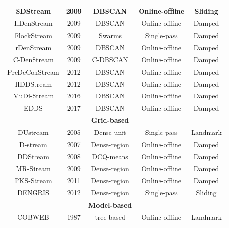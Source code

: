 \begin{table}[h]
\begin{tabular}{c c c c c}
     \hline
     SDStream            &    2009     &    DBSCAN       & Online-offline  &   Sliding \\
      \hline
      HDenStream         &     2009    &    DBSCAN       &  Online-offline &   Damped  \\
        \hline
      FlockStream        &     2009    &    Swarms       &  Single-pass    &   Damped  \\
        \hline 
      rDenStream         &    2009     &     DBSCAN      & Online-offline  &   Damped  \\
        \hline 
      C-DenStream        &    2009     &     C-DBSCAN    &Online-offline   &   Damped \\
          \hline 
      PreDeConStream     &    2012     &     DBSCAN      & Online-offline  &   Damped \\
          \hline 
      HDDStream          &    2012     &     DBSCAN      & Online-offline  &   Damped   \\
          \hline 
      MuDi-Stream        &    2016     &       DBSCAN    & Online-offline  &   Damped\\
      \hline          
      EDDS               &    2017     &     DBSCAN      & Online-offline  &   Damped \\
      \hline
      \hline
     \rowcolor{lightgray}& &\rowcolor{lightgray}\centering \textbf{Grid-based}  & &  \\
      \hline 
      \hline      
     DUstream            &    2005        &      Dense-unit       &     Single-pass    &  Landmark\\
      \hline
      D-stream           &     2007       &    Dense-region       &  Online-offline    &   Damped\\
    \hline 
      DDStream           &    2008        &    DCQ-means          &     Online-offline & Damped \\
    \hline 
      MR-Stream          &    2009        &     Dense-region      &  Online-offline    & Damped\\
    \hline 
      PKS-Stream         &    2011        &    Dense-region       &  Online-offline    & Damped\\
    \hline 
      DENGRIS            &    2012        &   Dense-region        &  Single-pass       & Sliding\\
      \hline 
      \hline
     \rowcolor{lightgray}& &\rowcolor{lightgray}\centering\textbf{Model-based}  & &  \\
      \hline 
      \hline
      COBWEB             &    1987        &   tree-based      &    Online-offline   & Landmark \\

\end{tabular}
\end{table}
